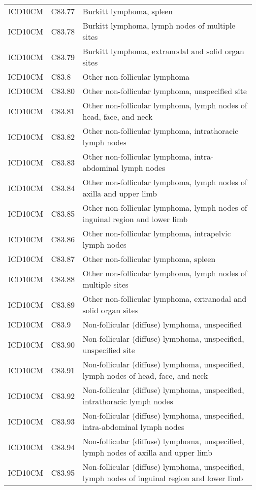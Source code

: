 \begin{longtable}{p{}p{}p{}}
  ICD10CM & C83.77 & Burkitt lymphoma, spleen \\ 
  ICD10CM & C83.78 & Burkitt lymphoma, lymph nodes of multiple sites \\ 
  ICD10CM & C83.79 & Burkitt lymphoma, extranodal and solid organ sites \\ 
  ICD10CM & C83.8 & Other non-follicular lymphoma \\ 
  ICD10CM & C83.80 & Other non-follicular lymphoma, unspecified site \\ 
  ICD10CM & C83.81 & Other non-follicular lymphoma, lymph nodes of head, face, and neck \\ 
  ICD10CM & C83.82 & Other non-follicular lymphoma, intrathoracic lymph nodes \\ 
  ICD10CM & C83.83 & Other non-follicular lymphoma, intra-abdominal lymph nodes \\ 
  ICD10CM & C83.84 & Other non-follicular lymphoma, lymph nodes of axilla and upper limb \\ 
  ICD10CM & C83.85 & Other non-follicular lymphoma, lymph nodes of inguinal region and lower limb \\ 
  ICD10CM & C83.86 & Other non-follicular lymphoma, intrapelvic lymph nodes \\ 
  ICD10CM & C83.87 & Other non-follicular lymphoma, spleen \\ 
  ICD10CM & C83.88 & Other non-follicular lymphoma, lymph nodes of multiple sites \\ 
  ICD10CM & C83.89 & Other non-follicular lymphoma, extranodal and solid organ sites \\ 
  ICD10CM & C83.9 & Non-follicular (diffuse) lymphoma, unspecified \\ 
  ICD10CM & C83.90 & Non-follicular (diffuse) lymphoma, unspecified, unspecified site \\ 
  ICD10CM & C83.91 & Non-follicular (diffuse) lymphoma, unspecified, lymph nodes of head, face, and neck \\ 
  ICD10CM & C83.92 & Non-follicular (diffuse) lymphoma, unspecified, intrathoracic lymph nodes \\ 
  ICD10CM & C83.93 & Non-follicular (diffuse) lymphoma, unspecified, intra-abdominal lymph nodes \\ 
  ICD10CM & C83.94 & Non-follicular (diffuse) lymphoma, unspecified, lymph nodes of axilla and upper limb \\ 
  ICD10CM & C83.95 & Non-follicular (diffuse) lymphoma, unspecified, lymph nodes of inguinal region and lower limb \\ 

\end{longtable}
